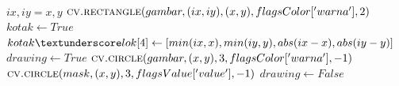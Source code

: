 \begin{algorithm}
\begin{algorithmic}
    \\
            \State $ix, iy = x, y$
            \State $\Call{cv.rectangle}{gambar, (ix, iy), (x, y), flagsColor['warna'], 2}$
            \State $kotak \gets True$
            \State $kotak\textunderscore lok[4] \gets [min(ix, x), min(iy, y), abs(ix-x), abs(iy-y)]$
        \EndIf 
            \State $drawing \gets True$
            \State $\Call{cv.circle}{gambar, (x, y), 3, flagsColor['warna'], -1}$
            \State $\Call{cv.circle}{mask, (x, y), 3, flagsValue['value'], -1}$
            \State $drawing \gets False$
        \EndIf 
    \EndFunction
    \\
\end{algorithmic}
\end{algorithm}

